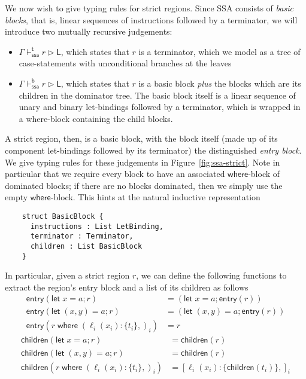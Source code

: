 \documentclass[acmsmall,screen,review]{acmart}
\newcommand{\ms}[1]{\ensuremath{\mathsf{#1}}}
\newcommand{\lto}{:}
\newcommand{\letstmt}[3]{\ensuremath{\ms{let}\;#1 = #2; #3}}
\newcommand{\where}[2]{#1\;\ms{where}\;#2}
\newcommand{\wbranch}[3]{#1(#2) \lto \{#3\}}
\newcommand{\thaslb}[3]{#1 \vdash^{\ms{t}}_{\ms{ssa}} #2 \rhd #3}
\newcommand{\bhaslb}[3]{#1 \vdash^{\ms{b}}_{\ms{ssa}} #2 \rhd #3}
\newcommand{\toentry}[1]{\ms{entry}(#1)}
\newcommand{\todom}[1]{\ms{children}(#1)}
\begin{document}
We now wish to give typing rules for strict regions. Since SSA consists of \emph{basic blocks}, that is,
linear sequences of instructions followed by a terminator, we will introduce two mutually
recursive judgements:
\begin{itemize}
  \item $\thaslb{\Gamma}{r}{\ms{L}}$, which states that $r$ is a terminator, which we model
  as a tree of case-statements with unconditional branches at the leaves
\item $\bhaslb{\Gamma}{r}{\ms{L}}$, which states that $r$ is a basic block \emph{plus} the blocks
  which are its children in the dominator tree. The basic block itself is a linear
  sequence of unary and binary let-bindings followed by a terminator, which is wrapped in a where-block
  containing the child blocks. 
\end{itemize}
A strict region, then, is a basic block, with the block itself (made up of its component
let-bindings followed by its terminator) the distinguished \emph{entry block}. We give typing rules
for these judgements in Figure~\ref{fig:ssa-strict}. Note in particular that we require every block
to have an associated \ms{where}-block of dominated blocks; if there are no blocks dominated, then
we simply use the empty \ms{where}-block. This hints at the natural inductive representation
\begin{lstlisting}
    struct BasicBlock {
      instructions : List LetBinding,
      terminator : Terminator,
      children : List BasicBlock
    }
\end{lstlisting}
In particular, given a strict region $r$, we can define the following functions to extract the
region's entry block and a list of its children as follows
\begin{equation}
  \begin{aligned}
    \toentry{\letstmt{x}{a}{r}} &= (\letstmt{x}{a}{\toentry{r}}) \\
    \toentry{\letstmt{(x, y)}{a}{r}} &= (\letstmt{(x, y)}{a}{\toentry{r}}) \\
    \toentry{\where{r}{(\wbranch{\ell_i}{x_i}{t_i},)_i}} &= r
  \end{aligned}
\end{equation}
\begin{equation}
  \begin{aligned}
    \todom{\letstmt{x}{a}{r}} &= \todom{r} \\
    \todom{\letstmt{(x, y)}{a}{r}} &= \todom{r} \\
    \todom{\where{r}{(\wbranch{\ell_i}{x_i}{t_i},)_i}} &= [\wbranch{\ell_i}{x_i}{\todom{t_i}},]_i
  \end{aligned}
\end{equation}
\end{document}
